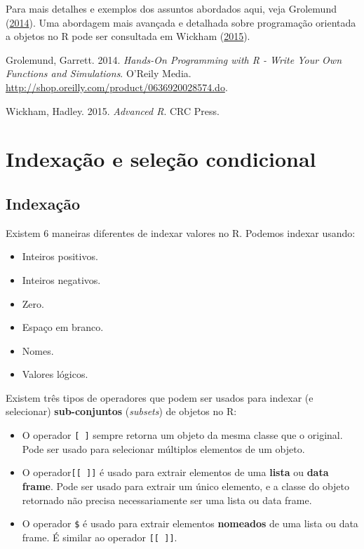 \documentclass[10pt,a4paper]{book}
\providecommand{\tightlist}{%
  \setlength{\itemsep}{0pt}\setlength{\parskip}{0pt}}
\begin{document}
Para mais detalhes e exemplos dos assuntos abordados aqui, veja
Grolemund (\protect\hyperlink{ref-Grolemund2014}{2014}). Uma abordagem
mais avançada e detalhada sobre programação orientada a objetos no R
pode ser consultada em Wickham
(\protect\hyperlink{ref-Wickham2015}{2015}).

\hypertarget{refs}{}
\hypertarget{ref-Grolemund2014}{}
Grolemund, Garrett. 2014. \emph{Hands-On Programming with R - Write Your
Own Functions and Simulations}. O'Reily Media.
\url{http://shop.oreilly.com/product/0636920028574.do}.

\hypertarget{ref-Wickham2015}{}
Wickham, Hadley. 2015. \emph{Advanced R}. CRC Press.

\chapter{Indexação e seleção
condicional}\label{indexauxe7uxe3o-e-seleuxe7uxe3o-condicional}

\section{Indexação}\label{indexauxe7uxe3o}

Existem 6 maneiras diferentes de indexar valores no R. Podemos indexar
usando:

\begin{itemize}
\tightlist
\item
  Inteiros positivos.
\item
  Inteiros negativos.
\item
  Zero.
\item
  Espaço em branco.
\item
  Nomes.
\item
  Valores lógicos.
\end{itemize}

Existem três tipos de operadores que podem ser usados para indexar (e
selecionar) \textbf{sub-conjuntos} (\emph{subsets}) de objetos no R:

\begin{itemize}
\tightlist
\item
  O operador \texttt{{[}\ {]}} sempre retorna um objeto da mesma classe
  que o original. Pode ser usado para selecionar múltiplos elementos de
  um objeto.
\item
  O operador\texttt{{[}{[}\ {]}{]}} é usado para extrair elementos de
  uma \textbf{lista} ou \textbf{data frame}. Pode ser usado para extrair
  um único elemento, e a classe do objeto retornado não precisa
  necessariamente ser uma lista ou data frame.
\item
  O operador \texttt{\$} é usado para extrair elementos
  \textbf{nomeados} de uma lista ou data frame. É similar ao operador
  \texttt{{[}{[}\ {]}{]}}.
\end{itemize}
\end{document}
